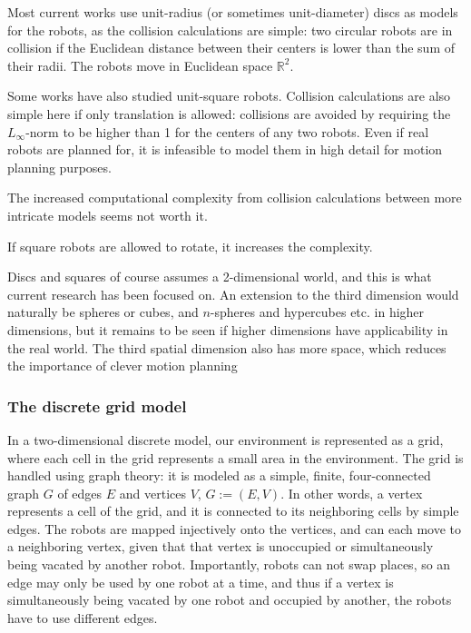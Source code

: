 Most current works use unit-radius (or sometimes unit-diameter) discs as models for the robots, as the collision calculations are simple: two circular robots are in collision if the Euclidean distance between their centers is lower than the sum of their radii. 
The robots move in Euclidean space $\mathbb{R}^2$. 

Some works have also studied unit-square robots. 
Collision calculations are also simple here if only translation is allowed:
collisions are avoided by requiring the $L_{\infty}$-norm to be higher than 1 for the centers of any two robots.
Even if real robots are planned for, it is infeasible to model them in high detail for motion planning purposes. 

The increased computational complexity from collision calculations between more intricate models seems not worth it. %

If square robots are allowed to rotate, it increases the complexity.

Discs and squares of course assumes a 2-dimensional world, and this is what current research has been focused on. 
An extension to the third dimension would naturally be spheres or cubes, and $n$-spheres and hypercubes etc. in higher dimensions, but it remains to be seen if higher dimensions have applicability in the real world.  
The third spatial dimension also has more space, which reduces the importance of clever motion planning 

\subsubsection{The discrete grid model}

In a two-dimensional discrete model, our environment is represented as a grid, where each cell in the grid represents a small area in the environment. 
The grid is handled using graph theory: it is modeled as a simple, finite, four-connected graph $G$ of edges $E$ and vertices $V$, $G := (E, V)$. 
In other words, a vertex represents a cell of the grid, and it is connected to its neighboring cells by simple  edges.
The robots are mapped injectively onto the vertices, and can each move to a neighboring vertex, given that that vertex is unoccupied or simultaneously being vacated by another robot. 
Importantly, robots can not swap places, so an edge may only be used by one robot at a time, and thus if a vertex is simultaneously being vacated by one robot and occupied by another, the robots have to use different edges.



